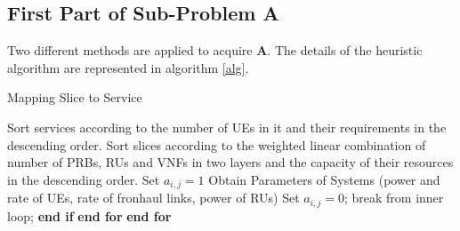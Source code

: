 \documentclass[conference]{IEEEtran}
\begin{document}
\subsection{First Part of Sub-Problem A}\label{firstsub}
Two different methods are applied to acquire $\boldsymbol{A}$.
The details of the heuristic algorithm are represented in algorithm \ref{alg}.
\begin{algorithm}
\caption{Mapping Slice to Service}\label{alg}
\begin{algorithmic}[1]
\State Sort services according to the number of UEs in it and their requirements in the descending order.
\State Sort slices according to the weighted linear combination of number of PRBs, RUs and VNFs in two layers and the capacity of their resources in the descending order.
\State Set $a_{i,j} = 1$
\State Obtain Parameters of Systems (power and rate of UEs, rate of fronhaul links, power of RUs)
\State Set $a_{i,j} = 0$;
\Else
\State break from inner loop;
\EndIf
\State \textbf{end if}
\EndFor
\State \textbf{end for}
\EndFor
\State \textbf{end for}
\end{algorithmic}
\end{algorithm}
\end{document}
